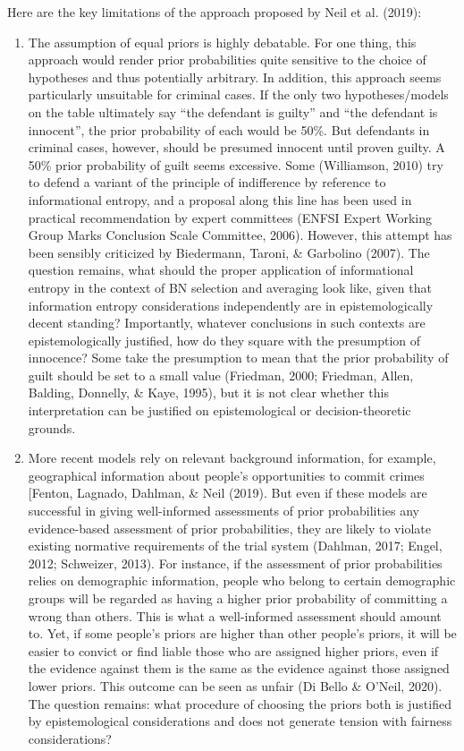 \documentclass[11pt,dvipsnames,enabledeprecatedfontcommands]{scrartcl}
\begin{document}
Here are the key limitations of the approach proposed by Neil et al.
(2019):

\begin{enumerate}
\def\labelenumi{\Alph{enumi}.}
\setcounter{enumi}{4}
\item
  The assumption of equal priors is highly debatable. For one thing,
  this approach would render prior probabilities quite sensitive to the
  choice of hypotheses and thus potentially arbitrary. In addition, this
  approach seems particularly unsuitable for criminal cases. If the only
  two hypotheses/models on the table ultimately say ``the defendant is
  guilty'' and ``the defendant is innocent'', the prior probability of
  each would be 50\%. But defendants in criminal cases, however, should
  be presumed innocent until proven guilty. A 50\% prior probability of
  guilt seems excessive. Some (Williamson, 2010) try to defend a variant
  of the principle of indifference by reference to informational
  entropy, and a proposal along this line has been used in practical
  recommendation by expert committees (ENFSI Expert Working Group Marks
  Conclusion Scale Committee, 2006). However, this attempt has been
  sensibly criticized by Biedermann, Taroni, \& Garbolino (2007). The
  question remains, what should the proper application of informational
  entropy in the context of BN selection and averaging look like, given
  that information entropy considerations independently are in
  epistemologically decent standing? Importantly, whatever conclusions
  in such contexts are epistemologically justified, how do they square
  with the presumption of innocence? Some take the presumption to mean
  that the prior probability of guilt should be set to a small value
  (Friedman, 2000; Friedman, Allen, Balding, Donnelly, \& Kaye, 1995),
  but it is not clear whether this interpretation can be justified on
  epistemological or decision-theoretic grounds.
\item
  More recent models rely on relevant background information, for
  example, geographical information about people's opportunities to
  commit crimes {[}Fenton, Lagnado, Dahlman, \& Neil (2019). But even if
  these models are successful in giving well-informed assessments of
  prior probabilities any evidence-based assessment of prior
  probabilities, they are likely to violate existing normative
  requirements of the trial system (Dahlman, 2017; Engel, 2012;
  Schweizer, 2013). For instance, if the assessment of prior
  probabilities relies on demographic information, people who belong to
  certain demographic groups will be regarded as having a higher prior
  probability of committing a wrong than others. This is what a
  well-informed assessment should amount to. Yet, if some people's
  priors are higher than other people's priors, it will be easier to
  convict or find liable those who are assigned higher priors, even if
  the evidence against them is the same as the evidence against those
  assigned lower priors. This outcome can be seen as unfair (Di Bello \&
  O'Neil, 2020). The question remains: what procedure of choosing the
  priors both is justified by epistemological considerations and does
  not generate tension with fairness considerations?
\end{enumerate}
\end{document}
